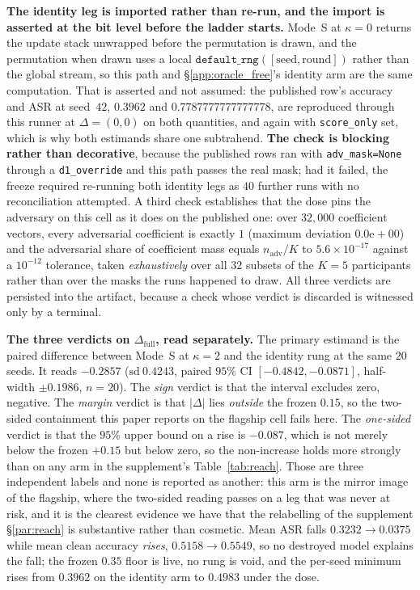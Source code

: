 \documentclass{article}
\begin{document}
\textbf{The identity leg is imported rather than re-run, and the import is asserted at the bit level before the ladder starts.} Mode~S at $\kappa{=}0$ returns the update stack unwrapped before the permutation is drawn, and the permutation when drawn uses a local $\texttt{default\_rng}([\mathrm{seed},\mathrm{round}])$ rather than the global stream, so this path and §\ref{app:oracle_free}'s identity arm are the same computation. That is asserted and not assumed: the published row's accuracy and ASR at seed~$42$, $0.3962$ and $0.7787777777777778$, are reproduced through this runner at $\Delta=(0,0)$ on both quantities, and again with \texttt{score\_only} set, which is why both estimands share one subtrahend. \textbf{The check is blocking rather than decorative}, because the published rows ran with \texttt{adv\_mask=None} through a \texttt{d1\_override} and this path passes the real mask; had it failed, the freeze required re-running both identity legs as $40$ further runs with no reconciliation attempted. A third check establishes that the dose pins the adversary on this cell as it does on the published one: over $32{,}000$ coefficient vectors, every adversarial coefficient is exactly $1$ (maximum deviation $0.0\mathrm{e}{+}00$) and the adversarial share of coefficient mass equals $n_{\mathrm{adv}}/K$ to $5.6{\times}10^{-17}$ against a $10^{-12}$ tolerance, taken \emph{exhaustively} over all $32$ subsets of the $K{=}5$ participants rather than over the masks the runs happened to draw. All three verdicts are persisted into the artifact, because a check whose verdict is discarded is witnessed only by a terminal.

\textbf{The three verdicts on $\Delta_{\mathrm{full}}$, read separately.} The primary estimand is the paired difference between Mode~S at $\kappa{=}2$ and the identity rung at the same $20$ seeds. It reads $\mathbf{-0.2857}$ ($\mathrm{sd}\ 0.4243$, paired $95\%$ CI $[-0.4842, -0.0871]$, half-width $\pm0.1986$, $n{=}20$). The \emph{sign} verdict is that the interval excludes zero, negative. The \emph{margin} verdict is that $|\Delta|$ lies \emph{outside} the frozen $0.15$, so the two-sided containment this paper reports on the flagship cell fails here. The \emph{one-sided} verdict is that the $95\%$ upper bound on a rise is $-0.087$, which is not merely below the frozen $+0.15$ but below zero, so the non-increase holds more strongly than on any arm in the supplement's Table~\ref{tab:reach}. Those are three independent labels and none is reported as another: this arm is the mirror image of the flagship, where the two-sided reading passes on a leg that was never at risk, and it is the clearest evidence we have that the relabelling of the supplement §\ref{par:reach} is substantive rather than cosmetic. Mean ASR falls $0.3232 \to 0.0375$ while mean clean accuracy \emph{rises}, $0.5158 \to 0.5549$, so no destroyed model explains the fall; the frozen $0.35$ floor is live, no rung is void, and the per-seed minimum rises from $0.3962$ on the identity arm to $0.4983$ under the dose.
\end{document}
